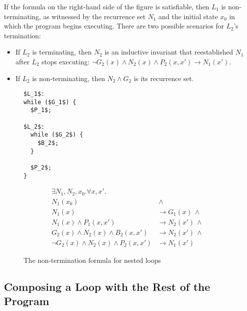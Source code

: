 \documentclass[preprint]{sigplanconf}
\theoremstyle{definition}
\begin{document}
If the formula on the right-hand side of the figure is satisfiable, then
$L_1$ is non-terminating, as witnessed by the recurrence set $N_1$ and the
initial state $x_0$ in which the program begins executing.  There are two
possible scenarios for $L_2$'s termination:
%
\begin{itemize}
%
\item If $L_2$ is terminating, then $N_2$ is an inductive invariant that
reestablished $N_1$ after $L_2$ stops executing: $\lnot G_2(x) \wedge N_2(x)
\wedge P_2(x,x') \rightarrow N_1(x') $.
%
\item If $L_2$ is non-terminating, then $N_2 \wedge G_2$ is its recurrence set.
%
\end{itemize}

\begin{figure*}
\begin{framed}
 \begin{minipage}{0.16\textwidth}
\begin{lstlisting}[mathescape=true]
$L_1$:
while ($G_1$) {
  $P_1$;

$L_2$:
  while ($G_2$) {
    $B_2$;
  }

  $P_2$;
}
\end{lstlisting}
\end{minipage}
\vline
\begin{minipage}{0.82\textwidth}
\begin{align*}
 \exists N_1, N_2, x_0 . \forall x, x' . \\
  N_1(x_0) & \, \wedge \\
  N_1(x) & \rightarrow G_1(x) \, \wedge \\
  N_1(x) \wedge P_1(x,x') & \rightarrow N_2(x') \, \wedge \\
  G_2(x) \wedge N_2(x) \wedge B_2(x,x') & \rightarrow N_2(x') \, \wedge \\
  \lnot G_2(x) \wedge N_2(x) \wedge P_2(x,x') & \rightarrow N_1(x') 
\end{align*}
\end{minipage}
\end{framed}

\caption{The non-termination formula for nested loops \label{fig:nonterm-nested}}
\end{figure*}




\subsection{Composing a Loop with the Rest of the Program} \label{sec:env}
\end{document}
